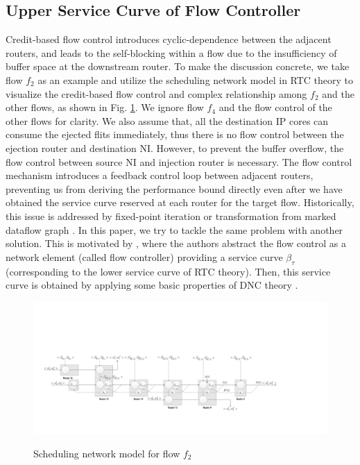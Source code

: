\documentclass[10pt,journal]{IEEEtran}
\begin{document}
\subsection{Upper Service Curve of Flow Controller}\label{flowcontrol}
Credit-based flow control introduces cyclic-dependence between the adjacent routers, and leads to the self-blocking within a flow due to the insufficiency of buffer space at the downstream router. To make the discussion concrete, we take flow $f_2$ as an example and utilize the scheduling network model \cite{1253607} in RTC theory to visualize the credit-based flow control and complex relationship among $f_2$ and the other flows, as shown in Fig. \ref{f2}. We ignore flow $f_4$ and the flow control of the other flows for clarity. We also assume that, all the destination IP cores can consume the ejected flits immediately, thus there is no flow control between the ejection router and destination NI. However, to prevent the buffer overflow, the flow control between source NI and injection router is necessary. The flow control mechanism introduces a feedback control loop between adjacent routers, preventing us from deriving the performance bound directly even after we have obtained the service curve reserved at each router for the target flow. Historically, this issue is addressed  by fixed-point iteration \cite{schioler2005network} or transformation from marked dataflow graph \cite{Thiele:2009:MPA:1629335.1629353}. In this paper, we try to tackle the same problem with another solution. This is motivated by \cite{qian2009analysis}, where the authors abstract the flow control as a network element (called flow controller) providing a service curve $\beta_{\tau}$ (corresponding to the lower service curve of RTC theory). Then, this service curve is obtained by applying some basic properties of DNC theory \cite{Boudec2001Network}.
\begin{figure}
  \centering
  \includegraphics[scale=0.35]{figures/f2.pdf}\\
  \caption{Scheduling network model for flow $f_2$}\label{f2}
\end{figure}
\end{document}
